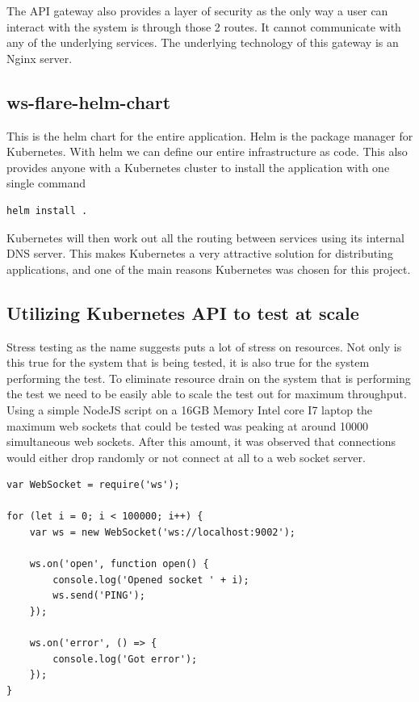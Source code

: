 The API gateway also provides a layer of security as the only way a user can interact with the system is through those 2 routes. It cannot communicate with any of the underlying services. The underlying technology of this gateway is an Nginx server.

\subsection{ws-flare-helm-chart}

This is the helm chart for the entire application. Helm is the package manager for Kubernetes. With helm we can define our entire infrastructure as code. This also provides anyone with a Kubernetes cluster to install the application with one single command

\begin{verbatim}
helm install .
\end{verbatim}

Kubernetes will then work out all the routing between services using its internal DNS server. This makes Kubernetes a very attractive solution for distributing applications, and one of the main reasons Kubernetes was chosen for this project.

\subsection{Utilizing Kubernetes API to test at scale}

Stress testing as the name suggests puts a lot of stress on resources. Not only is this true for the system that is being tested, it is also true for the system performing the test. To eliminate resource drain on the system that is performing the test we need to be easily able to scale the test out for maximum throughput. Using a simple NodeJS script on a 16GB Memory Intel core I7 laptop the maximum web sockets that could be tested was peaking at around 10000 simultaneous web sockets. After this amount, it was observed that connections would either drop randomly or not connect at all to a web socket server. 

\begin{verbatim}
var WebSocket = require('ws');

for (let i = 0; i < 100000; i++) {
    var ws = new WebSocket('ws://localhost:9002');

    ws.on('open', function open() {
        console.log('Opened socket ' + i);
        ws.send('PING');
    });

    ws.on('error', () => {
        console.log('Got error');
    });
}
\end{verbatim}

